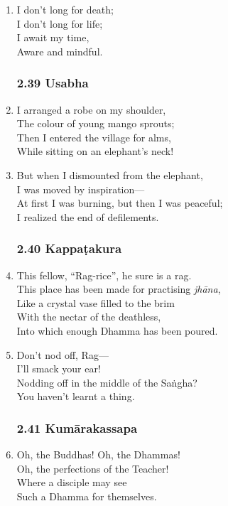 \documentclass[10pt, openany]{book}
\begin{document}
\begin{enumerate}
\item I don’t long for death;\\
I don’t long for life;\\
I await my time,\\
Aware and mindful.

\subsubsection*{2.39 Usabha}

\item I arranged a robe on my shoulder,\\
The colour of young mango sprouts;\\
Then I entered the village for alms,\\
While sitting on an elephant’s neck!

\item But when I dismounted from the elephant,\\
I was moved by inspiration—\\
At first I was burning, but then I was peaceful;\\
I realized the end of defilements.

\subsubsection*{2.40 Kappaṭakura}

\item This fellow, “Rag-rice”, he sure is a rag.\\
This place has been made for practising \emph{jhāna},\\
Like a crystal vase filled to the brim\\
With the nectar of the deathless,\\
Into which enough Dhamma has been poured.

\item Don’t nod off, Rag—\\
I’ll smack your ear!\\
Nodding off in the middle of the Saṅgha?\\
You haven’t learnt a thing.

\subsubsection*{2.41 Kumārakassapa}

\item Oh, the Buddhas! Oh, the Dhammas!\\
Oh, the perfections of the Teacher!\\
Where a disciple may see\\
Such a Dhamma for themselves.


\end{enumerate}
\end{document}
